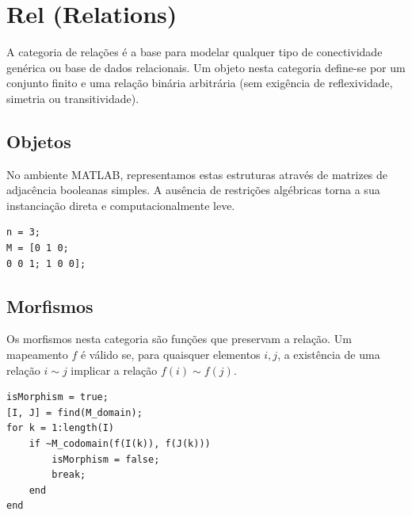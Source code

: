 \section{Rel (Relations)}
A categoria de relações é a base para modelar qualquer tipo de conectividade genérica ou base de dados relacionais.
Um objeto nesta categoria define-se por um conjunto finito e uma relação binária arbitrária (sem exigência de reflexividade, simetria ou transitividade).

\subsection{Objetos}
No ambiente MATLAB, representamos estas estruturas através de matrizes de adjacência booleanas simples.
A ausência de restrições algébricas torna a sua instanciação direta e computacionalmente leve.

\begin{lstlisting}[caption={Representação de uma Relação Arbitrária}]
% Matriz de adjacência para uma relação genérica
n = 3;
M = [0 1 0;
0 0 1; 1 0 0];
\end{lstlisting}

\subsection{Morfismos}
Os morfismos nesta categoria são funções que preservam a relação.
Um mapeamento $f$ é válido se, para quaisquer elementos $i, j$, a existência de uma relação $i \sim j$ implicar a relação $f(i) \sim f(j)$.

\begin{lstlisting}[caption={Algoritmo de Verificação de Preservação Relacional}]
% f é o vetor de mapeamento
isMorphism = true;
[I, J] = find(M_domain);
for k = 1:length(I)
    if ~M_codomain(f(I(k)), f(J(k)))
        isMorphism = false;
        break;
    end
end
\end{lstlisting}